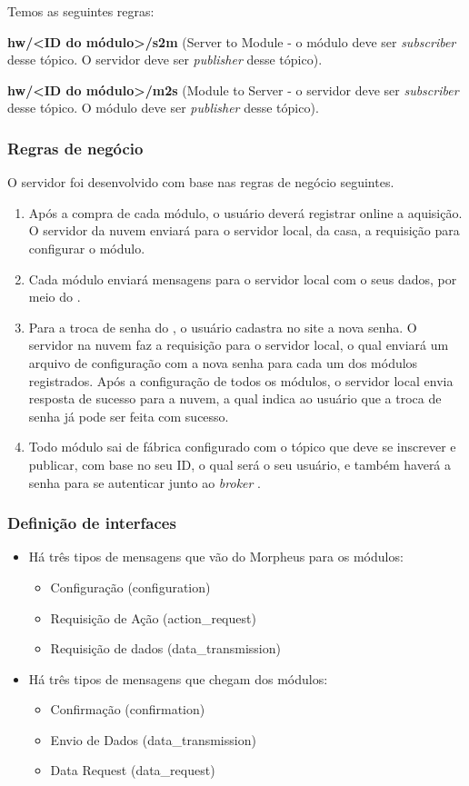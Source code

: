 Temos as seguintes regras:

\textbf{hw/\textless ID do módulo\textgreater /s2m} (Server to Module - o módulo deve ser \textit{subscriber} desse tópico. O servidor deve ser \textit{publisher} desse tópico).

\textbf{hw/\textless ID do módulo\textgreater /m2s} (Module to Server - o servidor deve ser \textit{subscriber} desse tópico. O módulo deve ser \textit{publisher} desse tópico).

\subsubsection{Regras de negócio}
O servidor foi desenvolvido com base nas regras de negócio seguintes.
\begin{enumerate}
\item Após a compra de cada módulo, o usuário deverá registrar online a aquisição. O servidor da nuvem enviará para o servidor local, da casa, a requisição para configurar o módulo.
\item Cada módulo enviará mensagens para o servidor local com o seus dados, por meio do \wmqtt{}.
\item Para a troca de senha do \wwifi, o usuário cadastra no site a nova senha. O servidor na nuvem faz a requisição para o servidor local, o qual enviará um arquivo de configuração com a nova senha para cada um dos módulos registrados. Após a configuração de todos os módulos, o servidor local envia resposta de sucesso para a nuvem, a qual indica ao usuário que a troca de senha já pode ser feita com sucesso.
\item Todo módulo sai de fábrica configurado com o tópico que deve se inscrever e publicar, com base no seu ID, o qual será o seu usuário, e também haverá a senha para se autenticar junto ao \textit{broker} \wmqtt{}.
\end{enumerate}

\subsubsection{Definição de interfaces}
\begin{itemize}
\item Há três tipos de mensagens que vão do Morpheus para os módulos:
  \begin{itemize}
  \item Configuração (configuration)
  \item Requisição de Ação (action\_request)
  \item Requisição de dados (data\_transmission)
  \end{itemize}
\item Há três tipos de mensagens que chegam dos módulos:
  \begin{itemize}
  \item Confirmação (confirmation)
  \item Envio de Dados (data\_transmission)
  \item Data Request (data\_request)
  \end{itemize}
\end{itemize}

